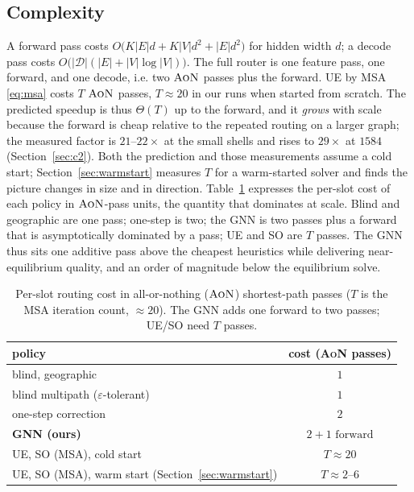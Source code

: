 \documentclass[journal]{IEEEtran}
\newcommand{\AoN}{\textsc{AoN}}
\begin{document}
\subsection{Complexity}\label{sec:complexity}
A forward pass costs $O\!\big(K|E|d+K|V|d^2+|E|d^2\big)$ for hidden width $d$; a decode
pass costs $O\!\big(|\mathcal{D}|(|E|+|V|\log|V|)\big)$. The full router is one feature
pass, one forward, and one decode, i.e. two $\AoN$ passes plus the forward. UE by MSA
\eqref{eq:msa} costs $T$ $\AoN$ passes, $T\!\approx\!20$ in our runs when started from
scratch. The predicted
speedup is thus $\Theta(T)$ up to the forward, and it \emph{grows} with scale because
the forward is cheap relative to the repeated routing on a larger graph; the measured
factor is $21$--$22\times$ at the small shells and rises to $29\times$ at $1584$
(Section~\ref{sec:c2}). Both the prediction and those measurements assume a cold start;
Section~\ref{sec:warmstart} measures $T$ for a warm-started solver and finds the picture
changes in size and in direction. Table~\ref{tab:cost} expresses the per-slot cost of each policy
in $\AoN$-pass units, the quantity that dominates at scale. Blind and geographic are one
pass; one-step is two; the GNN is two passes plus a forward that is asymptotically
dominated by a pass; UE and SO are $T$ passes. The GNN thus sits one additive pass above
the cheapest heuristics while delivering near-equilibrium quality, and an order of
magnitude below the equilibrium solve.

\begin{table}[t]
\centering\footnotesize\setlength{\tabcolsep}{3pt}
\caption{Per-slot routing cost in all-or-nothing ($\AoN$) shortest-path passes ($T$ is
the MSA iteration count, $\approx 20$). The GNN adds one forward to two passes; UE/SO
need $T$ passes.}
\label{tab:cost}
\begin{tabular}{lc}
\toprule
policy & cost (\AoN{} passes) \\
\midrule
blind, geographic & $1$ \\
blind multipath ($\varepsilon$-tolerant) & $1$ \\
one-step correction & $2$ \\
\textbf{GNN (ours)} & $2 + \text{1 forward}$ \\
UE, SO (MSA), cold start & $T\approx 20$ \\
UE, SO (MSA), warm start (Section~\ref{sec:warmstart}) & $T\approx 2$--$6$ \\
\bottomrule
\end{tabular}
\end{table}
\end{document}
